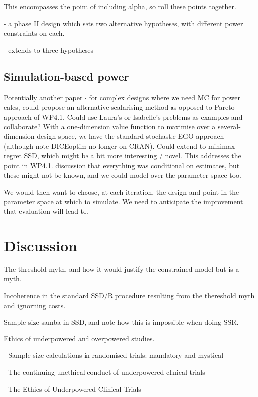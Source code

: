 \documentclass[sagev, Crown]{sagej}
\begin{document}
This encompasses the point of including alpha, so roll these points together.

\cite{Lin2004} - a phase II design which sets two alternative hypotheses, with different power constraints on each.

\cite{Kim2017} - extends to three hypotheses

\subsection{Simulation-based power}

Potentially another paper - for complex designs where we need MC for power calcs, could propose an alternative scalarising method as opposed to Pareto approach of WP4.1. Could use Laura's or Isabelle's problems as examples and collaborate? With a one-dimension value function to maximise over a several-dimension design space, we have the standard stochastic EGO approach (although note DICEoptim no longer on CRAN). Could extend to minimax regret SSD, which might be a bit more interesting / novel. This addresses the point in WP4.1. discussion that everything was conditional on estimates, but these might not be known, and we could model over the parameter space too. 

We would then want to choose, at each iteration, the design and point in the parameter space at which to simulate. We need to anticipate the improvement that evaluation will lead to. 

\section{Discussion}\label{sec:discussion}

The threshold myth, and how it would justify the constrained model but is a myth.

Incoherence in the standard SSD/R procedure resulting from the thereshold myth and ignorning costs.

Sample size samba in SSD, and note how this is impossible when doing SSR.

Ethics of underpowered and overpowered studies.

\cite{Schulz2005} - Sample size calculations in randomised trials: mandatory and mystical

\cite{Halpern2002} - The continuing unethical conduct of underpowered clinical trials

\cite{Lilford2002} - The Ethics of Underpowered Clinical Trials
\end{document}
